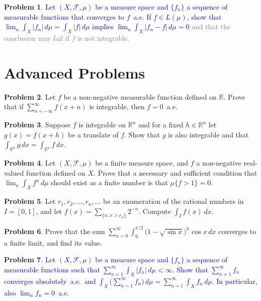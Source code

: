 \documentclass[12pt,reqno]{amsart}
\def\field#1{\mathbb{#1}}
\def\abs#1{\lvert {#1} \rvert}
\theoremstyle{definition}
\newtheorem{problem}{Problem}
\theoremstyle{remark}
\begin{document}
\begin{problem}
  \textcolor{blue}{Let $(X, \mathcal{F}, \mu)$ be a measure space and
    $\{ f_n \}$ a sequence of measurable functions that converges to
    $f$~a.e.  If $f \in L(\mu)$, show that $\lim_n \int_X \abs{f_n}\,
    d\mu = \int_X \abs{f}\, d\mu$ implies $\lim_n \int_X \abs{f_n -
      f}\, d\mu = 0$} \textcolor{gray}{and that the conclusion may
    fail if $f$ is not integrable.}
\end{problem}

\section{Advanced Problems}
\begin{problem}
  Let $f$ be a non-negative measurable function defined on
  $\field{R}$.  Prove that if $\sum_{n=-\infty}^\infty f(x+n)$ is
  integrable, then $f = 0$~a.e.
\end{problem}
\begin{problem}
  Suppose $f$ is integrable on $\field{R}^n$ and for a fixed $h \in
  \field{R}^n$ let $g(x) = f(x+h)$ be a translate of $f$.  Show that
  $g$ is also integrable and that $\int_{\field{R}^n} g\, dx =
  \int_{\field{R}^n} f\, dx$.
\end{problem}
\begin{problem}
  Let $(X, \mathcal{F}, \mu)$ be a finite measure space, and $f$ a
  non-negative real-valued function defined on $X$. Prove that a
  necessary and sufficient condition that $\lim_n \int_X f^n\, d\mu$
  should exist as a finite number is that $\mu \{ f > 1 \} = 0$.
\end{problem}
\begin{problem}
  Let $r_1, r_2, \dotsc, r_n, \dotsc$ be an enumeration of the
  rational numbers in $I = [0,1]$, and let $f(x) = \sum_{\{ n : x >
    r_n \} } 2^{-n}$.  Compute $\int_I f(x)\, dx$.
\end{problem}
\begin{problem}
  Prove that the sum $\sum_{n=0}^\infty \int_0^{\pi/2} \big(
  1-\sqrt{\sin x} \big)^n \cos x\, dx$ converges to a finite limit,
  and find its value.
\end{problem}
\begin{problem}\label{forJan03}
  \textcolor{blue}{Let $(X,\mathcal{F},\mu)$ be a measure space and
    $\{ f_n \}$ a sequence of measurable functions such that
    $\sum_{n=1}^\infty \int_X \abs{f_n}\, d\mu < \infty$.  Show that
    $\sum_{n=1}^\infty f_n$ converges absolutely~a.e.~and $\int_X
    \big( \sum_{n=1}^\infty f_n \big)\, d\mu = \sum_{n=1}^\infty
    \int_X f_n\, d\mu$.  In particular, also $\lim_n f_n = 0$~a.e.}
\end{problem}
\end{document}
